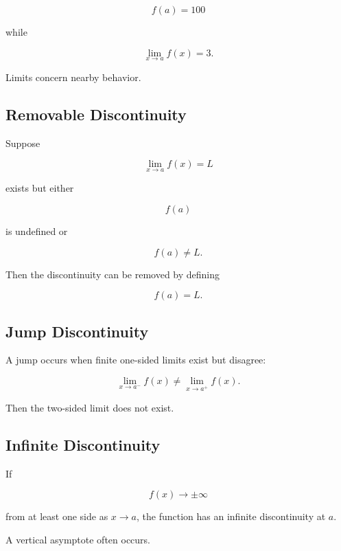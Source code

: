 \[
f(a)=100
\]

while

\[
\lim_{x\to a}f(x)=3.
\]

Limits concern nearby behavior.

\subsection{Removable Discontinuity}
\label{subsec:removable-discontinuity-limit}

Suppose

\[
\lim_{x\to a}f(x)=L
\]

exists but either

\[
f(a)
\]

is undefined or

\[
f(a)\neq L.
\]

Then the discontinuity can be removed by defining

\[
\boxed{
f(a)=L.
}
\]

\subsection{Jump Discontinuity}
\label{subsec:jump-discontinuity-limit}

A jump occurs when finite one-sided limits exist but disagree:

\[
\boxed{
\lim_{x\to a^-}f(x)
\neq
\lim_{x\to a^+}f(x).
}
\]

Then the two-sided limit does not exist.

\subsection{Infinite Discontinuity}
\label{subsec:infinite-discontinuity-limit}

If

\[
f(x)
\to
\pm\infty
\]

from at least one side as \(x\to a\), the function has an infinite
discontinuity at \(a\).

A vertical asymptote often occurs.

